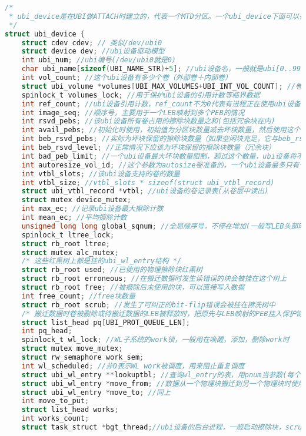 \begin{lstlisting}[language=C]
/*
 * ubi_device是在UBI做ATTACH时建立的，代表一个MTD分区。一个ubi_device下面可以存在多个卷
 */
struct ubi_device {
	struct cdev cdev; // 类似/dev/ubi0
	struct device dev; //ubi设备驱动模型
	int ubi_num; //ubi编号(/dev/ubi0就是0)
	char ubi_name[sizeof(UBI_NAME_STR)+5]; //ubi设备名，一般就是ubi[0..99]
	int vol_count; //这个ubi设备有多少个卷（外部卷＋内部卷）
	struct ubi_volume *volumes[UBI_MAX_VOLUMES+UBI_INT_VOL_COUNT]; //卷指针数组，用于查找卷
	spinlock_t volumes_lock; //用于保护ubi设备的引用计数等临界数据
	int ref_count; //ubi设备引用计数，ref_count不为0代表有进程正在使用ubi设备，此时不能删除ubi设备
	int image_seq; //顺序号，主要用于一个LEB映射到多个PEB的情况
	int rsvd_pebs; //该ubi设备所有卷占用的擦除块数量之和(包括冗余块在内)
	int avail_pebs; //初始化时使用，初始值为分区块数量减去坏块数量，然后使用这个值去分配其它块数量
	int beb_rsvd_pebs; //实际为坏块保留的擦除块数量（如果空闲块充足，它与beb_rsvd_level相等）
	int beb_rsvd_level; //正常情况下应该为坏块保留的擦除块数量（冗余块）
	int bad_peb_limit; //一个ubi设备最大坏块数量限制，超过这个数量，ubi设备将不能使用
	int autoresize_vol_id; //这个参数为autosize卷准备的，一个ubi设备最多只有一个autosize卷
	int vtbl_slots; //该ubi设备支持的卷的数量
	int vtbl_size; //vtbl_slots * sizeof(struct ubi_vtbl_record)
	struct ubi_vtbl_record *vtbl; //ubi设备的卷记录表(从卷层中读出)
	struct mutex device_mutex;
	int max_ec; //记录ubi设备最大擦除计数
	int mean_ec; //平均擦除计数
	unsigned long long global_sqnum; //全局顺序号，不停在增加(一般写LEB头部时增加)
	spinlock_t ltree_lock;
	struct rb_root ltree;
	struct mutex alc_mutex;
	/* 这些红黑树上都是挂的ubi_wl_entry结构 */
	struct rb_root used; //已使用的物理擦除块红黑树
	struct rb_root erroneous; //在搬迁数据时发生读错误的块会被挂在这个树上
	struct rb_root free; //被擦除后未使用的块，可以直接写入数据
	int free_count; //free块数量
	struct rb_root scrub; //发生了可纠正的bit-flip错误会被挂在擦洗树中
	/* 搬迁数据时卷被删除或待搬迁数据的LEB被释放时，把原先与LEB映射的PEB挂入保护链表 */
	struct list_head pq[UBI_PROT_QUEUE_LEN]; 
	int pq_head;
	spinlock_t wl_lock; //WL子系统的work锁，一般用在唤醒，添加，删除work时
	struct mutex move_mutex;
	struct rw_semaphore work_sem;
	int wl_scheduled; //非0表示WL work被调度，用来阻止重复调度
	struct ubi_wl_entry **lookuptbl; //查询wl_entry的表，用pnum当参数(每个物理块都有这个结构)
	struct ubi_wl_entry *move_from; //数据从一个物理块搬迁到另一个物理块时使用
	struct ubi_wl_entry *move_to; //同上
	int move_to_put;
	struct list_head works;
	int works_count;
	struct task_struct *bgt_thread;//ubi设备的后台进程，一般启动擦除块，scrub块等工作 

\end{lstlisting}
